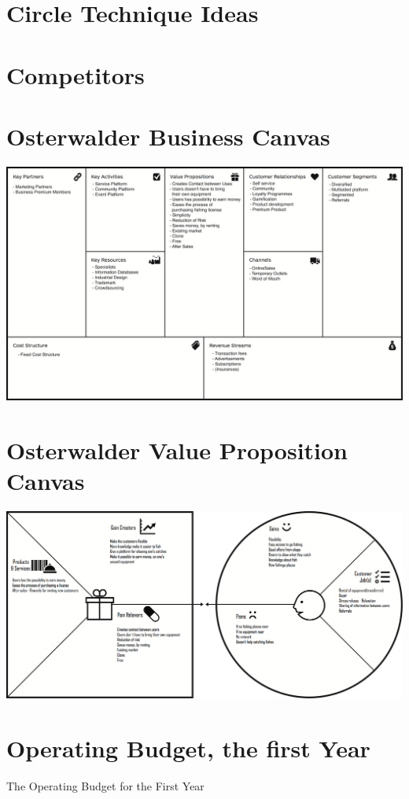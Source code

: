 

\begin{appendices}
  \renewcommand\thetable{\thesection}
  \renewcommand\thefigure{\thesection}

	\section{Circle Technique Ideas} \label{app:circ}
		
		\newpage
	
	\section{Competitors} \label{app:comp}
		
		\newpage
		
	\section{Osterwalder Business Canvas} \label{app:bcanvas}
	\includegraphics[width=.95\textwidth]{images/business_canvas}
	\newpage

	\section{Osterwalder Value Proposition Canvas} \label{app:vpcanvas}
	\includegraphics[width=.95\textwidth]{images/value_proposition_canvas}
	\newpage
	
	\section{Operating Budget, the first Year}  \label{tab:bud:oper:fy} 
		\begin{table}[H]
		\centering
		\caption{The Operating Budget for the First Year}
		    
		\end{table}

\end{appendices}

